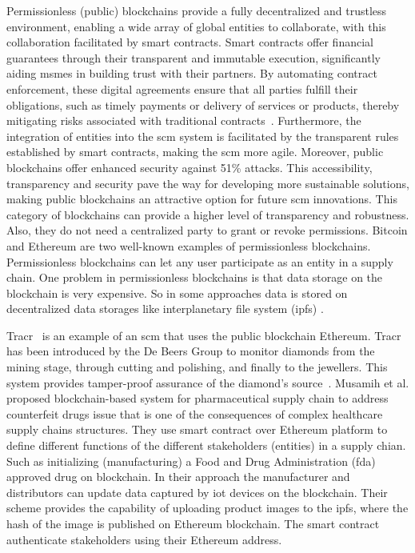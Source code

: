 Permissionless (public) blockchains provide a fully decentralized and trustless environment, enabling a wide array of global entities to collaborate, with this collaboration facilitated by smart contracts. Smart contracts offer financial guarantees through their transparent and immutable execution, significantly aiding \glspl{msme} in building trust with their partners. By automating contract enforcement, these digital agreements ensure that all parties fulfill their obligations, such as timely payments or delivery of services or products, thereby mitigating risks associated with traditional contracts~\cite{Agapiou2023SmartContracts}. Furthermore, the integration of entities into the \gls{scm} system is facilitated by the transparent rules established by smart contracts, making the \gls{scm} more agile. Moreover, public blockchains offer enhanced security against 51\% attacks. This accessibility, transparency and security pave the way for developing more sustainable solutions, making public blockchains an attractive option for future \gls{scm} innovations.  This category of blockchains can provide a higher level of transparency and robustness. Also, they do not need a centralized party to grant or revoke permissions. Bitcoin and Ethereum are two well-known examples of permissionless blockchains. Permissionless blockchains can let any user participate as an entity in a supply chain. One problem in permissionless blockchains is that data storage on the blockchain is very expensive. So in some approaches data is stored on decentralized data storages like interplanetary file system (\gls{ipfs}) \cite{Benet2014}.

Tracr\texttrademark~\cite{Tracr} is an example of an \gls{scm} that uses the public blockchain Ethereum. Tracr has been introduced by the De Beers Group to monitor diamonds from the mining stage, through cutting and polishing, and finally to the jewellers. This system provides tamper-proof assurance of the diamond's source~\cite{Kshetri2022}. 
Musamih et al. \cite{Musamih2021} proposed blockchain-based system for pharmaceutical supply chain to address counterfeit drugs issue that is one of the consequences of complex healthcare supply chains structures. They use smart contract over Ethereum platform to define different functions of the different stakeholders (entities) in a supply chian. Such as initializing (manufacturing) a Food and Drug Administration (\gls{fda}) approved drug on blockchain. In their approach the manufacturer and distributors can update data captured by \gls{iot} devices on the blockchain. Their scheme provides the capability of uploading product images to the  \gls{ipfs}, where the hash of the image is published on Ethereum blockchain. The smart contract authenticate stakeholders using their Ethereum address.

